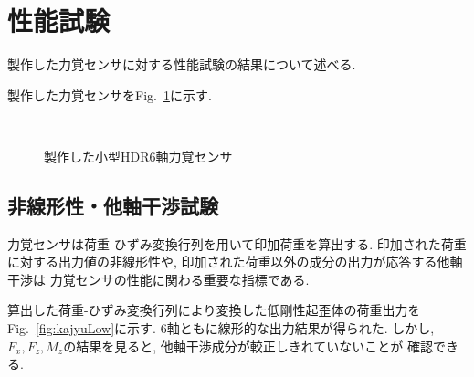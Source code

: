 \section{性能試験}
製作した力覚センサに対する性能試験の結果について述べる. 

製作した力覚センサをFig.~\ref{fig:jissai}に示す.

\begin{figure}[h]
  \centering
  \\
  \caption[]{製作した小型HDR6軸力覚センサ}\label{fig:jissai}
\end{figure}

\subsection{非線形性・他軸干渉試験}
力覚センサは荷重-ひずみ変換行列を用いて印加荷重を算出する. 
印加された荷重に対する出力値の非線形性や, 
印加された荷重以外の成分の出力が応答する他軸干渉は
力覚センサの性能に関わる重要な指標である. 
 

算出した荷重-ひずみ変換行列により変換した低剛性起歪体の荷重出力を
Fig.~\ref{fig:kajyuLow}に示す.
6軸ともに線形的な出力結果が得られた. 
しかし, $F_x, F_z, M_z$の結果を見ると, 他軸干渉成分が較正しきれていないことが
確認できる. 



